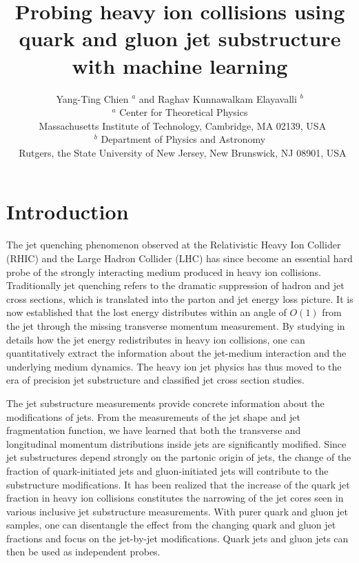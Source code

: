 \documentclass[notoc]{JHEP3}
\title{Probing heavy ion collisions using quark and gluon jet substructure with machine learning}
\author{Yang-Ting Chien $^{a}$ and Raghav Kunnawalkam Elayavalli $^{b}$\\
$^{a}$ Center for Theoretical Physics\\
$~$ Massachusetts Institute of Technology, Cambridge, MA 02139, USA\\
$^{b}$ Department of Physics and Astronomy\\
$~$ Rutgers, the State University of New Jersey, New Brunswick, NJ 08901, USA\\
}
\begin{document}
\section{Introduction}
\label{sec:intro}

The jet quenching phenomenon observed at the Relativistic Heavy Ion Collider (RHIC) \cite{Adcox:2001jp,Adler:2002xw,Adcox:2004mh,Arsene:2004fa,Back:2004je,Adams:2005dq}
and the Large Hadron Collider (LHC)\cite{Aamodt:2010jd,Abelev:2012hxa,Abelev:2013kqa,Aad:2012vca,Aad:2014bxa,Chatrchyan:2013kwa,
Chatrchyan:2012gw,Chatrchyan:2014ava,Aad:2014wha,Chatrchyan:2013exa,
Adam:2015ewa,Chatrchyan:2012gt,Chatrchyan:2011sx,Chatrchyan:2012nia,Aad:2010bu,Aad:2013sla,Adam:2015doa,Aad:2015bsa} has since become an essential hard probe of the strongly interacting medium produced in heavy ion collisions. Traditionally jet quenching refers to the dramatic suppression of hadron and jet cross sections, which is translated into the parton and jet energy loss picture. It is now established that the lost energy distributes within an angle of $O(1)$ from the jet through the missing transverse momentum measurement. By studying in details how the jet energy redistributes in heavy ion collisions, one can quantitatively extract the information about the jet-medium interaction and the underlying medium dynamics. The heavy ion jet physics has thus moved to the era of precision jet substructure and classified jet cross section studies.

The jet substructure measurements provide concrete information about the modifications of jets. From the measurements of the jet shape and jet fragmentation function, we have learned that both the transverse and longitudinal momentum distributions inside jets are significantly modified. Since jet substructures depend strongly on the partonic origin of jets, the change of the fraction of quark-initiated jets and gluon-initiated jets will contribute to the substructure modifications. It has been realized that the increase of the quark jet fraction in heavy ion collisions constitutes the narrowing of the jet cores seen in various inclusive jet substructure measurements. With purer quark and gluon jet samples, one can disentangle the effect from the changing quark and gluon jet fractions and focus on the jet-by-jet modifications. Quark jets and gluon jets can then be used as independent probes.
\end{document}
